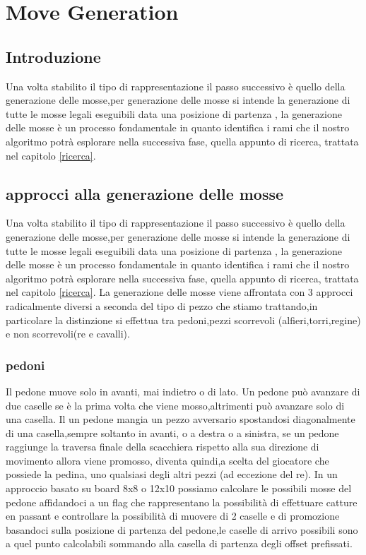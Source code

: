 \chapter{Move Generation}
\label{move generation} %
%


\newpage


\section{Introduzione} %
Una volta stabilito il tipo di rappresentazione il passo successivo è quello della generazione delle mosse,per generazione delle mosse si intende la generazione
di tutte le mosse legali eseguibili data una posizione di partenza , la generazione delle mosse è un processo fondamentale in quanto identifica i rami che
il nostro algoritmo potrà esplorare nella successiva fase, quella appunto di ricerca, trattata nel capitolo \ref{ricerca}.





\section{approcci alla generazione delle mosse}
Una volta stabilito il tipo di rappresentazione il passo successivo è quello della generazione delle mosse,per generazione delle mosse si intende la generazione
di tutte le mosse legali eseguibili data una posizione di partenza , la generazione delle mosse è un processo fondamentale in quanto identifica i rami che
il nostro algoritmo potrà esplorare nella successiva fase, quella appunto di ricerca, trattata nel capitolo \ref{ricerca}.
La generazione delle mosse viene affrontata con 3 approcci radicalmente diversi a seconda del tipo di pezzo che stiamo trattando,in particolare la distinzione si effettua tra 
pedoni,pezzi scorrevoli (alfieri,torri,regine) e non scorrevoli(re e cavalli).

\subsection{pedoni}
Il pedone muove solo in avanti, mai indietro o di lato. Un pedone può avanzare  di due caselle se è la prima volta che viene mosso,altrimenti può avanzare solo di una casella.
Il un pedone mangia un pezzo avversario spostandosi diagonalmente di una casella,sempre soltanto in avanti, o a destra o a sinistra, se un pedone raggiunge la traversa finale della scacchiera rispetto alla sua direzione di movimento
allora viene promosso, diventa quindi,a scelta del giocatore che possiede la pedina, uno qualsiasi degli altri pezzi  (ad eccezione del re).
In un approccio basato su board 8x8 o 12x10 possiamo calcolare le possibili mosse del pedone affidandoci a un flag che rappresentano la possibilità di effettuare catture en passant e controllare la possibilità 
di muovere di 2 caselle e di promozione basandoci sulla posizione di partenza del pedone,le caselle di arrivo possibili sono a quel punto calcolabili sommando alla casella di partenza degli offset prefissati.




